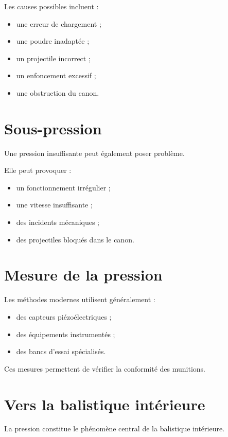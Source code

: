 Les causes possibles incluent :

\begin{itemize}
    \item une erreur de chargement ;
    \item une poudre inadaptée ;
    \item un projectile incorrect ;
    \item un enfoncement excessif ;
    \item une obstruction du canon.
\end{itemize}

\section{Sous-pression}

Une pression insuffisante peut également poser problème.

Elle peut provoquer :

\begin{itemize}
    \item un fonctionnement irrégulier ;
    \item une vitesse insuffisante ;
    \item des incidents mécaniques ;
    \item des projectiles bloqués dans le canon.
\end{itemize}

\section{Mesure de la pression}

Les méthodes modernes utilisent généralement :

\begin{itemize}
    \item des capteurs piézoélectriques ;
    \item des équipements instrumentés ;
    \item des bancs d'essai spécialisés.
\end{itemize}

Ces mesures permettent de vérifier la conformité des munitions.

\section{Vers la balistique intérieure}

La pression constitue le phénomène central de la balistique intérieure.

